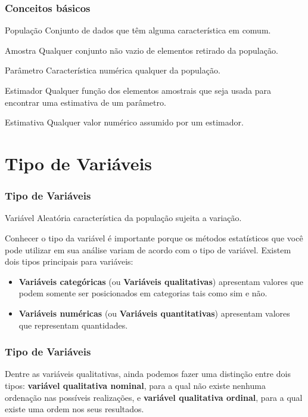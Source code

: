 \documentclass[12pt]{beamer}
\begin{document}
\begin{frame}{}
\frametitle{Conceitos básicos}
\vspace{-0.3cm}
\begin{block}{População}
\justifying
Conjunto de dados que têm alguma característica em comum.
\end{block}
\pause
\begin{block}{Amostra}
\justifying
Qualquer conjunto não vazio de elementos retirado da população.
\end{block}
\pause
\begin{block}{Parâmetro}
\justifying
Característica numérica qualquer da população.
\end{block}
\pause
\begin{block}{Estimador}
\justifying
Qualquer função dos elementos amostrais que seja usada para encontrar uma estimativa de um parâmetro.
\end{block}
\pause
\begin{block}{Estimativa}
\justifying
Qualquer valor numérico assumido por um estimador.
\end{block}
\end{frame}

\section{Tipo de Variáveis}
\begin{frame}{}
\frametitle{Tipo de Variáveis}
\begin{block}{Variável Aleatória}
\justifying
característica da população sujeita a variação.
\end{block}
\pause
\begin{block}{}
\justifying
Conhecer o tipo da variável é importante porque os métodos estatísticos que você pode utilizar em sua análise variam de acordo com o tipo de variável. Existem dois 
tipos principais para variáveis:
\begin{itemize}
\item {\bf Variáveis categóricas} (ou {\bf Variáveis qualitativas}) apresentam valores que podem somente ser posicionados em categorias tais como sim e não. \pause
\item {\bf Variáveis numéricas} (ou {\bf Variáveis quantitativas}) apresentam valores que representam quantidades.
\end{itemize}
\end{block}
\end{frame}

\begin{frame}{}
\frametitle{Tipo de Variáveis}
\begin{block}{}
\justifying
Dentre as variáveis qualitativas, ainda podemos fazer uma distinção entre dois tipos: \textbf{variável qualitativa nominal}, para a qual não existe nenhuma ordenação nas
possíveis realizações, e \textbf{variável qualitativa ordinal}, para a qual existe uma ordem nos seus resultados.
\end{block}
\end{frame}
\end{document}
